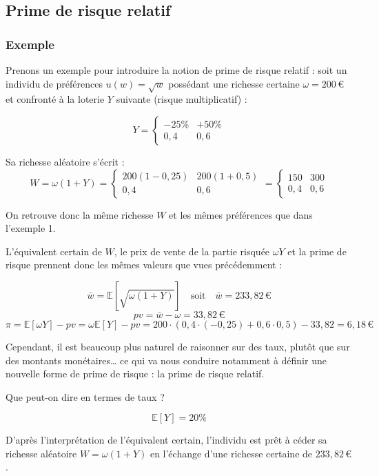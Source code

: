 \documentclass[a4paper, 12pt]{report}
\begin{document}
\subsection{Prime de risque relatif}

\subsubsection{Exemple}

Prenons un exemple pour introduire la notion de prime de risque relatif : soit un individu de préférences \( u(w) = \sqrt{w}\) possédant une richesse certaine \( \omega = 200 \, € \) et confronté à la loterie \( Y \) suivante (risque multiplicatif) :

\[
Y = 
\begin{cases}
-25\% & +50\% \\
0,4 & 0,6
\end{cases}
\]

Sa richesse aléatoire s'écrit :
\[
W = \omega (1 + Y) = 
\begin{cases}
	200 (1 - 0,25) & 	200 (1 + 0,5) \\
0,4 & 0,6
\end{cases} = 
\begin{cases}
	150 & 300\\
	0,4 & 0,6
\end{cases}
\]

On retrouve donc la même richesse \( W \) et les mêmes préférences que dans l'exemple 1.

L'équivalent certain de \( W \), le prix de vente de la partie risquée \( \omega Y \) et la prime de risque prennent donc les mêmes valeurs que vues précédemment :

\[
\bar{w} = \mathbb{E}\left[\sqrt{\omega (1 + Y)}\right] \quad \text{soit} \quad \bar{w} = 233,82 \, \text{€}
\]
\[
pv = \bar{w} - \omega = 33,82 \, \text{€}
\]
\[
\pi = \mathbb{E}[\omega Y] - pv = \omega \mathbb{E}[Y] - pv = 200 \cdot \left( 0,4 \cdot (-0,25) + 0,6 \cdot 0,5 \right) - 33,82 = 6,18 \, \text{€}
\]

Cependant, il est beaucoup plus naturel de raisonner sur des taux, plutôt que sur des montants monétaires… ce qui va nous conduire notamment à définir une nouvelle forme de prime de risque : la prime de risque relatif.

Que peut-on dire en termes de taux ?

\[
\mathbb{E}[Y] = 20\%
\]

D'après l'interprétation de l'équivalent certain, l'individu est prêt à céder sa richesse aléatoire \( W = \omega (1 + Y) \) en l'échange d'une richesse certaine de \( 233,82 \, \text{€} \).
\end{document}
